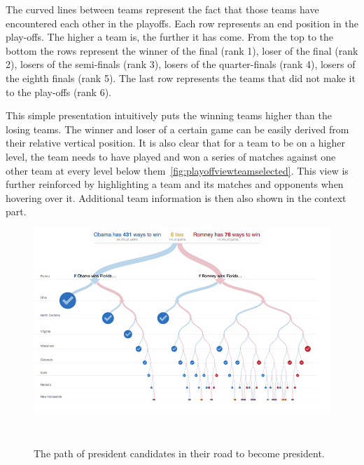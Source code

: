 \documentclass[chi_draft]{sigchi}
\begin{document}
The curved lines between teams represent the fact that those teams have 
encountered each other in the playoffs. Each row represents an end position 
in the play-offs. The higher a team is, the further it has come.  From the 
top to the bottom the rows represent the winner of the final (rank 1), loser 
of the final (rank 2), losers of the semi-finals (rank 3), losers of the 
quarter-finals (rank 4), losers of the eighth finals (rank 5). The last row 
represents the teams that did not make it to the play-offs (rank 6). 

This simple presentation intuitively puts the winning teams higher than the
losing teams. The winner and loser of a certain game can be easily derived from 
their relative vertical position. It is also clear that for a team to be on a 
higher level, the team needs to have played and won a series of matches against 
one other team at every level below them~\ref{fig:playoffviewteamselected}. 
This view is further reinforced by highlighting a team and its matches and 
opponents when hovering over it. Additional team information is then also shown 
in the context part.

\begin{figure}
\centering
  \includegraphics[width=1.0\columnwidth]{figures/presidentcandidatesvisualization}
  \caption{The path of president candidates in their road to become president.}~\label{fig:whitehousepath}
\end{figure}
\end{document}

